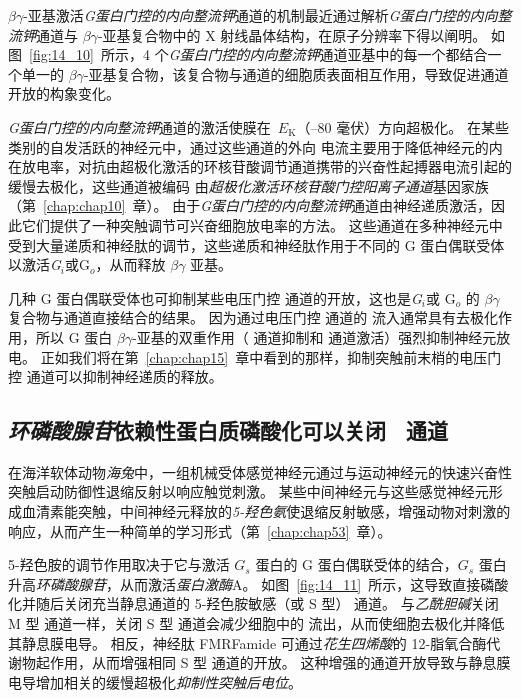 $\beta \gamma$-亚基激活\textit{G蛋白门控的内向整流钾}通道的机制最近通过解析\textit{G蛋白门控的内向整流钾}通道与 $\beta \gamma$-亚基复合物中的 X 射线晶体结构，在原子分辨率下得以阐明。
如图~\ref{fig:14_10}~所示，4 个\textit{G蛋白门控的内向整流钾}通道亚基中的每一个都结合一个单一的 $\beta \gamma$-亚基复合物，该复合物与通道的细胞质表面相互作用，导致促进通道开放的构象变化。


\textit{G蛋白门控的内向整流钾}通道的激活使膜在~$E_\text{K}$（–80 毫伏）方向超极化。
在某些类别的自发活跃的神经元中，通过这些通道的外向  电流主要用于降低神经元的内在放电率，对抗由超极化激活的环核苷酸调节通道携带的兴奋性起搏器电流引起的缓慢去极化，这些通道被编码 由\textit{超极化激活环核苷酸门控阳离子通道}基因家族（第~\ref{chap:chap10}~章）。
由于\textit{G蛋白门控的内向整流钾}通道由神经递质激活，因此它们提供了一种突触调节可兴奋细胞放电率的方法。
这些通道在多种神经元中受到大量递质和神经肽的调节，这些递质和神经肽作用于不同的 G 蛋白偶联受体以激活\textit{G$_i $}或G$_o$，从而释放 $\beta \gamma$ 亚基。


几种 G 蛋白偶联受体也可抑制某些电压门控  通道的开放，这也是\textit{G$_i $}或 G$_o$ 的 $\beta \gamma$ 复合物与通道直接结合的结果。
因为通过电压门控  通道的  流入通常具有去极化作用，所以 G 蛋白 $\beta \gamma$-亚基的双重作用（ 通道抑制和  通道激活）强烈抑制神经元放电。
正如我们将在第~\ref{chap:chap15}~章中看到的那样，抑制突触前末梢的电压门控  通道可以抑制神经递质的释放。



\subsection{\textit{环磷酸腺苷}依赖性蛋白质磷酸化可以关闭~ 通道}

在海洋软体动物\textit{海兔}中，一组机械受体感觉神经元通过与运动神经元的快速兴奋性突触启动防御性退缩反射以响应触觉刺激。
某些中间神经元与这些感觉神经元形成血清素能突触，中间神经元释放的\textit{5-羟色氨}使退缩反射敏感，增强动物对刺激的响应，从而产生一种简单的学习形式（第~\ref{chap:chap53}~章）。


5-羟色胺的调节作用取决于它与激活 $ G_s $ 蛋白的 G 蛋白偶联受体的结合，$ G_s $ 蛋白升高\textit{环磷酸腺苷}，从而激活\textit{蛋白激酶}A。
如图~\ref{fig:14_11}~所示，这导致直接磷酸化并随后关闭充当静息通道的 5-羟色胺敏感（或 S 型） 通道。
与\textit{乙酰胆碱}关闭 M 型  通道一样，关闭 S 型  通道会减少细胞中的  流出，从而使细胞去极化并降低其静息膜电导。
相反，神经肽 FMRFamide 可通过\textit{花生四烯酸}的 12-脂氧合酶代谢物起作用，从而增强相同 S 型  通道的开放。
这种增强的通道开放导致与静息膜电导增加相关的缓慢超极化\textit{抑制性突触后电位}。


